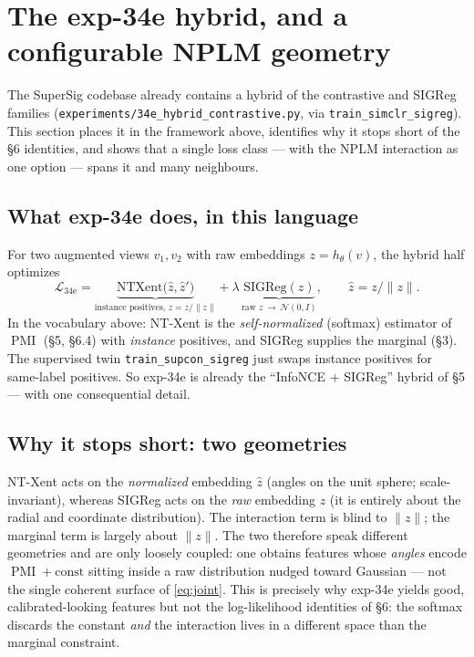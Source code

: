 \documentclass[11pt]{article}
\begin{document}
\section{The exp-34e hybrid, and a configurable NPLM geometry}
The SuperSig codebase already contains a hybrid of the contrastive and SIGReg
families (\texttt{experiments/34e\_hybrid\_contrastive.py}, via
\texttt{train\_simclr\_sigreg}). This section places it in the framework above,
identifies why it stops short of the \S6 identities, and shows that a single loss
class --- with the NPLM interaction as one option --- spans it and many neighbours.

\subsection{What exp-34e does, in this language}
For two augmented views $v_1,v_2$ with raw embeddings $z=h_\theta(v)$, the hybrid
half optimizes
\begin{equation}
\mathcal{L}_{\text{34e}}
= \underbrace{\mathrm{NTXent}\!\big(\hat z,\hat z'\big)}_{\text{instance positives, }\hat z = z/\|z\|}
+ \lambda\,\underbrace{\mathrm{SIGReg}(z)}_{\text{raw }z\,\to\,\mathcal{N}(0,I)},
\qquad \hat z = z/\|z\|.
\end{equation}
In the vocabulary above: NT-Xent is the \emph{self-normalized} (softmax) estimator
of $\operatorname{PMI}$ (\S5, \S6.4) with \emph{instance} positives, and SIGReg
supplies the marginal (\S3). The supervised twin \texttt{train\_supcon\_sigreg}
just swaps instance positives for same-label positives. So exp-34e is already the
``InfoNCE $+$ SIGReg'' hybrid of \S5 --- with one consequential detail.

\subsection{Why it stops short: two geometries}
NT-Xent acts on the \emph{normalized} embedding $\hat z$ (angles on the unit
sphere; scale-invariant), whereas SIGReg acts on the \emph{raw} embedding $z$ (it
is entirely about the radial and coordinate distribution). The interaction term is
blind to $\|z\|$; the marginal term is largely about $\|z\|$. The two therefore
speak different geometries and are only loosely coupled: one obtains features whose
\emph{angles} encode $\operatorname{PMI}+\text{const}$ sitting inside a
raw distribution nudged toward Gaussian --- not the single coherent surface of
\eqref{eq:joint}. This is precisely why exp-34e yields good, calibrated-looking
features but not the log-likelihood identities of \S6: the softmax discards the
constant \emph{and} the interaction lives in a different space than the marginal
constraint.
\end{document}

